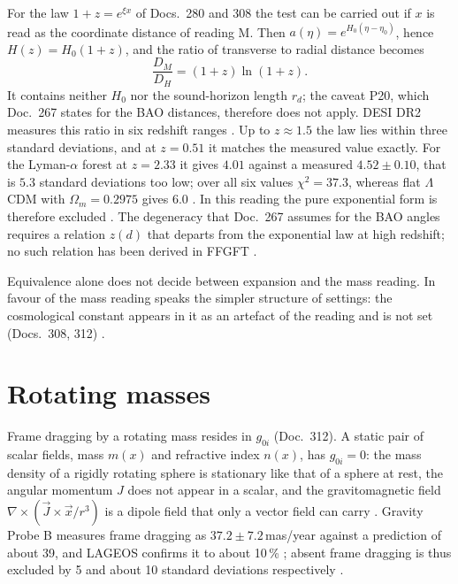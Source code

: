 For the law $1+z=e^{\xi x}$ of Docs.~280 and 308 the test can be carried out if $x$ is read as the
coordinate distance of reading M. Then $a(\eta)=e^{H_0(\eta-\eta_0)}$, hence $H(z)=H_0(1+z)$, and the
ratio of transverse to radial distance becomes
\begin{equation}
\frac{D_M}{D_H}=(1+z)\ln(1+z).
\end{equation}
It contains neither $H_0$ nor the sound-horizon length $r_d$; the caveat P20, which Doc.~267 states for
the BAO distances, therefore does not apply. DESI DR2~\cite{DESI2025} measures this ratio in six
redshift ranges \QM. Up to $z\approx1.5$ the law lies within three standard deviations, and at
$z=0.51$ it matches the measured value exactly. For the Lyman-$\alpha$ forest at $z=2.33$ it gives
$4.01$ against a measured $4.52\pm0.10$, that is $5.3$ standard deviations too low; over all six values
$\chi^2=37.3$, whereas flat $\Lambda$CDM with $\Omega_m=0.2975$ gives $6.0$ \KM. In this reading the
pure exponential form is therefore excluded \XM. The degeneracy that Doc.~267 assumes for the BAO
angles requires a relation $z(d)$ that departs from the exponential law at high redshift; no such
relation has been derived in FFGFT \SM.

Equivalence alone does not decide between expansion and the mass reading. In favour of the mass
reading speaks the simpler structure of settings: the cosmological constant appears in it as an
artefact of the reading and is not set (Docs.~308, 312) \SM.

\section{Rotating masses}

Frame dragging by a rotating mass resides in $g_{0i}$ (Doc.~312). A static pair of scalar fields, mass
$m(x)$ and refractive index $n(x)$, has $g_{0i}=0$: the mass density of a rigidly rotating sphere is
stationary like that of a sphere at rest, the angular momentum $J$ does not appear in a scalar, and the
gravitomagnetic field $\nabla\times(\vec J\times\vec x/r^3)$ is a dipole field that only a vector field
can carry \BM. Gravity Probe B measures frame dragging as $37.2\pm7.2$\,mas/year against a prediction
of about 39, and LAGEOS confirms it to about 10\,\% \QM; absent frame dragging is thus excluded by 5
and about 10 standard deviations respectively \KM.

